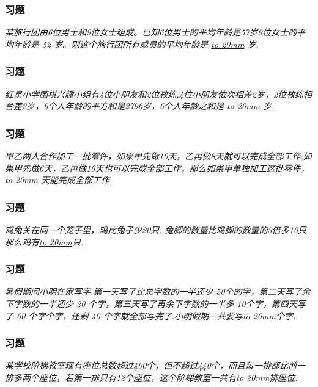 \begin{frame}
    \frametitle{习题\theframecounter}
    \vspace*{-3cm}
    \textit{某旅行团由6位男士和9位女士组成。已知6位男士的平均年龄是57岁9位女士的平均年龄是 52 岁。则这个旅行团所有成员的平均年龄是 \underline{\hbox to 20mm{}} 岁.} 
\end{frame}

\begin{frame}
    \frametitle{习题\theframecounter}
    \vspace*{-3cm}
    \textit{红星小学围棋兴趣小组有4位小朋友和2位教练,4位小朋友依次相差2岁，2位教练相台差2岁，6个人年龄的平方和是2796岁，6个人年龄之和是 \underline{\hbox to 20mm{}} 岁.} 
\end{frame}

\begin{frame}
    \frametitle{习题\theframecounter}
    \vspace*{-3cm}
    \textit{甲乙两人合作加工一批零件，如果甲先做10天，乙再做8天就可以完成全部工作;如果甲先做6天，乙再做16天也可以完成全部工作，那么如果甲单独加工这批零件，\underline{\hbox to 20mm{}}
    天能完成全部工作.} 
\end{frame}


\begin{frame}
    \frametitle{习题\theframecounter}
    \vspace*{-3cm}
    \textit{鸡兔关在同一个笼子里，鸡比兔子少20只. 兔脚的数量比鸡脚的数量的3倍多10只.那么鸡有\underline{\hbox to 20mm{}}只.} 
\end{frame}

\begin{frame}
    \frametitle{习题\theframecounter}
    \vspace*{-3cm}
    \textit{暑假期间小明在家写字.第一天写了比总字数的一半还少 50个的字，第二天写了余下字数的一半还少 20 个字，第三天写了再余下字数的一半多 10个字，第四天写了 60 个字个字，还剩 40 个字就全部写完了:小明假期一共要写\underline{\hbox to 20mm{}}个字.} 
\end{frame}

\begin{frame}
    \frametitle{习题\theframecounter}
    \vspace*{-3cm}
    \textit{某学校阶梯教室现有座位总数超过400个，但不超过440个，而且每一排都比前一排多两个座位，若第一排只有12个座位，这个阶梯教室一共有\underline{\hbox to 20mm{}}排座位.} 
\end{frame}


